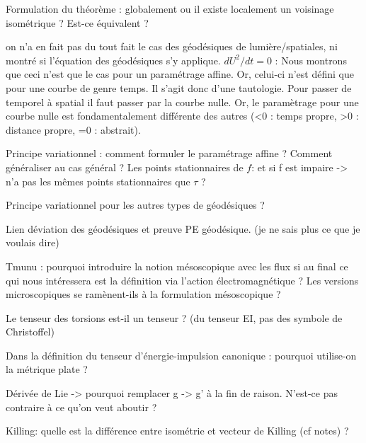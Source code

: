 \begin{rmk}
    Formulation du théorème : globalement ou il existe localement un voisinage isométrique ? Est-ce équivalent ?
\end{rmk}
\begin{quest}
    on n'a en fait pas du tout fait le cas des géodésiques de lumière/spatiales, ni montré si l'équation des géodésiques s'y applique.
    $dU^2/dt = 0$ : Nous montrons que ceci n'est que le cas pour un paramétrage affine. Or, celui-ci n'est défini que pour une courbe de genre temps. Il s'agit donc d'une tautologie. Pour passer de temporel à spatial il faut passer par la courbe nulle. Or, le paramètrage pour une courbe nulle est fondamentalement différente des autres (<0 : temps propre, >0 : distance propre, =0 : abstrait).
\end{quest}  
\begin{quest}
    Principe variationnel : comment formuler le paramétrage affine ? Comment généraliser au cas général ?
    Les points stationnaires de $f$: et si f est impaire -> n'a pas les mêmes points stationnaires que $\tau$ ? 
\end{quest}
\begin{quest}
    Principe variationnel pour les autres types de géodésiques ?
\end{quest}
\begin{quest}
    Lien déviation des géodésiques et preuve PE géodésique. (je ne sais plus ce que je voulais dire)
\end{quest}
\begin{quest}
    Tmunu : pourquoi introduire la notion mésoscopique avec les flux si au final ce qui nous intéressera est la définition via l'action électromagnétique ? Les versions microscopiques se ramènent-ils à la formulation mésoscopique ?
\end{quest}
\begin{quest}
    Le tenseur des torsions est-il un tenseur ? (du tenseur EI, pas des symbole de Christoffel)
\end{quest}
\begin{quest}
    Dans la définition du tenseur d'énergie-impulsion canonique : pourquoi utilise-on la métrique plate ?
\end{quest}
\begin{quest}
    Dérivée de Lie -> pourquoi remplacer g -> g' à la fin de raison. N'est-ce pas contraire à ce qu'on veut aboutir ?
\end{quest}
\begin{quest}
    Killing: quelle est la différence entre isométrie et vecteur de Killing (cf notes) ?
\end{quest}
